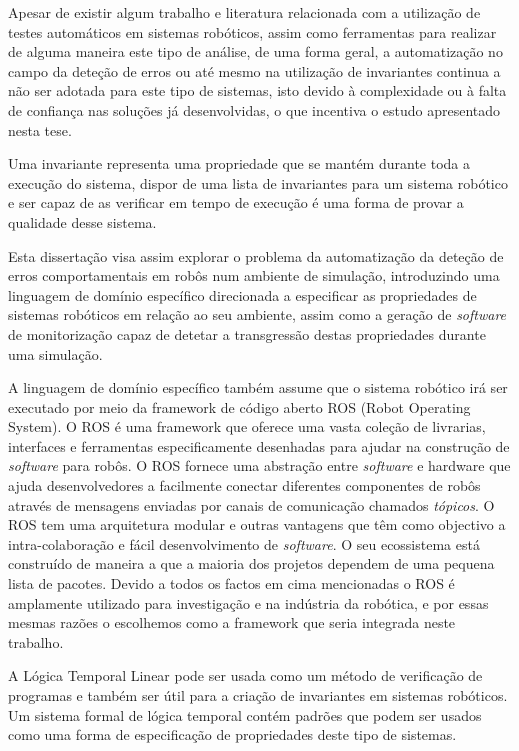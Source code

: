 Apesar de existir algum trabalho e literatura relacionada com a utilização de testes automáticos em sistemas robóticos, assim como ferramentas para realizar de alguma maneira este tipo de análise, de uma forma geral, a automatização no campo da deteção de erros ou até mesmo na utilização de invariantes continua a não ser adotada para este tipo de sistemas, isto devido à complexidade ou à falta de confiança nas soluções já desenvolvidas, o que incentiva o estudo apresentado nesta tese.

Uma invariante representa uma propriedade que se mantém durante toda a execução do sistema, dispor de uma lista de invariantes para um sistema robótico e ser capaz de as verificar em tempo de execução é uma forma de provar a qualidade desse sistema.

Esta dissertação visa assim explorar o problema da automatização da deteção de erros comportamentais em robôs num ambiente de simulação, introduzindo uma linguagem de domínio específico direcionada a especificar as propriedades de sistemas robóticos em relação ao seu ambiente, assim como a geração de \textit{software} de monitorização capaz de detetar a transgressão destas propriedades durante uma simulação.

A linguagem de domínio específico também assume que o sistema robótico irá ser executado por meio da framework de código aberto ROS (Robot Operating System). O ROS é uma framework que oferece uma vasta coleção de livrarias, interfaces e ferramentas especificamente desenhadas para ajudar na construção de \textit{software} para robôs. O ROS fornece uma abstração entre \textit{software} e hardware que ajuda desenvolvedores a facilmente conectar diferentes componentes de robôs através de mensagens enviadas por canais de comunicação chamados \textit{tópicos}. O ROS tem uma arquitetura modular e outras vantagens que têm como objectivo a intra-colaboração e fácil desenvolvimento de \textit{software}. O seu ecossistema está construído de maneira a que a maioria dos projetos dependem de uma pequena lista de pacotes. Devido a todos os factos em cima mencionadas o ROS é amplamente utilizado para investigação e na indústria da robótica, e por essas mesmas razões o escolhemos como a framework que seria integrada neste trabalho.

A Lógica Temporal Linear pode ser usada como um método de verificação de programas e também ser útil para a criação de invariantes em sistemas robóticos. Um sistema formal de lógica temporal contém padrões que podem ser usados como uma forma de especificação de propriedades deste tipo de sistemas.


